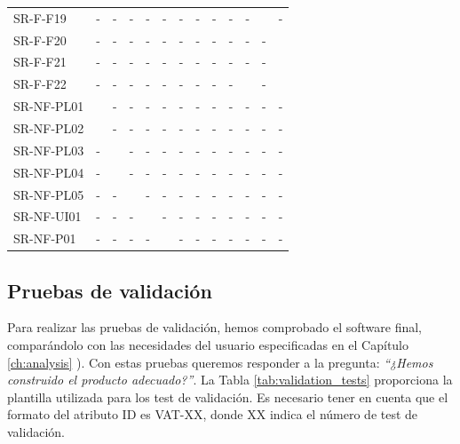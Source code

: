 \begin{table}[htb]
\begin{tabular}{@{}L{3cm}C{0.7cm}C{0.7cm}C{0.7cm}C{0.7cm}C{0.7cm}C{0.7cm}C{0.7cm}C{0.7cm}C{0.7cm}C{0.7cm}C{0.7cm}C{0.7cm}@{}}
    SR-F-F19 & - & - & - & - & - & - & - & - & - & - &  & - \\
    SR-F-F20 & - & - & - & - & - & - & - & - & - & - & - &  \\
    SR-F-F21 & - & - & - & - & - & - & - & - & - & - & - &  \\
    SR-F-F22 & - & - & - & - & - & - & - & - & - &  & - &  \\
    SR-NF-PL01 &  & - & - & - & - & - & - & - & - & - & - & - \\
    SR-NF-PL02 &  & - & - & - & - & - & - & - & - & - & - & - \\
    SR-NF-PL03 & - &  & - & - & - & - & - & - & - & - & - & - \\
    SR-NF-PL04 & - &  & - & - & - & - & - & - & - & - & - & - \\
    SR-NF-PL05 & - & - &  & - & - & - & - & - & - & - & - & - \\
    SR-NF-UI01 & - & - & - &  & - & - & - & - & - & - & - & - \\
    SR-NF-P01 & - & - & - & - &  & - & - & - & - & - & - & - \\
    \bottomrule
\end{tabular}
\label{tab:verification_matrix}
\end{table}    

\clearpage

\subsection{Pruebas de validación}


Para realizar las pruebas de validación, hemos comprobado el software final, comparándolo con las necesidades del usuario especificadas en el Capítulo \ref{ch:analysis} \textit{}). Con estas pruebas queremos responder a la pregunta: \emph{``¿Hemos construido el producto adecuado?''}. La Tabla \ref{tab:validation_tests} proporciona la plantilla utilizada para los test de validación. Es necesario tener en cuenta que el formato del atributo ID es VAT-XX, donde XX indica el número de test de validación.


